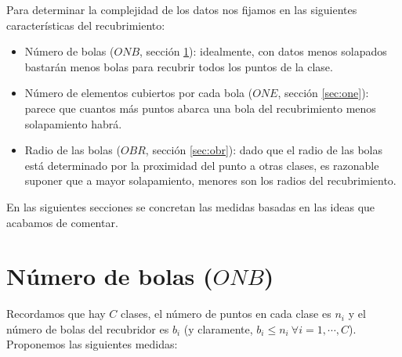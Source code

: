 \documentclass[a4paper,12pt]{report}
\theoremstyle{definition}
\begin{document}
Para determinar la complejidad de los datos nos fijamos en las siguientes características del recubrimiento:

\begin{itemize}
\item Número de bolas ($ONB$, sección \ref{sec:onb}): idealmente, con datos menos solapados bastarán menos bolas para recubrir todos los puntos de la clase.
\item Número de elementos cubiertos por cada bola ($ONE$, sección \ref{sec:one}): parece que cuantos más puntos abarca una bola del recubrimiento menos solapamiento habrá.
\item Radio de las bolas ($OBR$, sección \ref{sec:obr}): dado que el radio de las bolas está determinado por la proximidad del punto a otras clases, es razonable suponer que a mayor solapamiento, menores son los radios del recubrimiento.
\end{itemize}

En las siguientes secciones se concretan las medidas basadas en las ideas que acabamos de comentar.
\section{Número de bolas ($ONB$)}
\label{sec:onb}

Recordamos que hay $C$ clases, el número de puntos en cada clase es $n_i$ y el número de bolas del recubridor es $b_i$ (y claramente, $b_i \leq n_i \ \forall i = 1, \cdots, C$). Proponemos las siguientes medidas:
\end{document}
